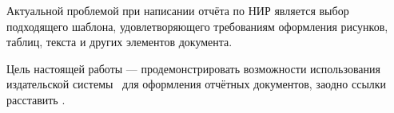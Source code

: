 
Актуальной проблемой при написании отчёта по НИР является выбор подходящего шаблона, удовлетворяющего требованиям оформления рисунков, таблиц, текста и других элементов документа.

Цель настоящей работы --- продемонстрировать возможности использования издательской системы \LaTeXe\ для оформления отчётных документов, заодно ссылки расставить \cite{SoetaertRJ2010}.